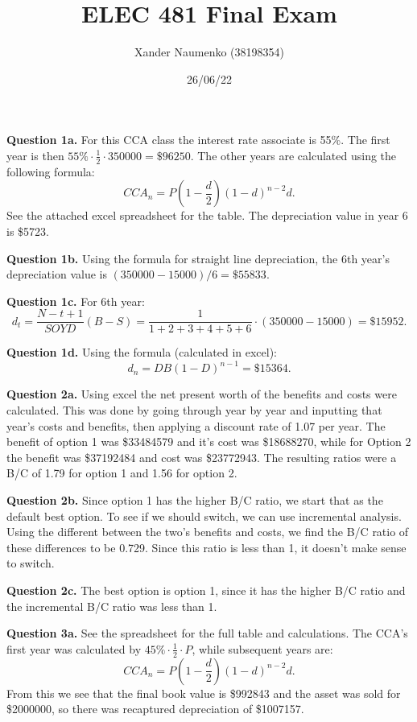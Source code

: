 \documentclass[letterpaper, reqno,11pt]{article}
\begin{document}
\title{ELEC 481 Final Exam}
\date{26/06/22}
\author{Xander Naumenko (38198354)}
\maketitle

{\noindent\bf Question 1a.} For this CCA class the interest rate associate is 55\%. The first year is then $55\%\cdot \frac{1}{2}\cdot 350000=\$96250$. The other years are calculated using the following formula: 
\[
CCA_n=P (1-\frac{d}{2})(1-d)^{n-2}d
.\]
See the attached excel spreadsheet for the table. The depreciation value in year 6 is \$5723. 

{\noindent\bf Question 1b.} Using the formula for straight line depreciation, the 6th year's depreciation value is $(350000-15000) /6=\$55833$. 

{\noindent\bf Question 1c.} For 6th year: 
\[
d_t=\frac{N-t+1}{SOYD}(B-S)=\frac{1}{1+2+3+4+5+6}\cdot (350000-15000)=\$15952
.\]

{\noindent\bf Question 1d.} Using the formula (calculated in excel): 
\[
d_n=DB(1-D)^{n-1}=\$15364
.\]

{\noindent\bf Question 2a.} Using excel the net present worth of the benefits and costs were calculated. This was done by going through year by year and inputting that year's costs and benefits, then applying a discount rate of 1.07 per year. The benefit of option 1 was \$33484579 and it's cost was \$18688270, while for Option 2 the benefit was \$37192484 and cost was \$23772943. The resulting ratios were a B/C of 1.79 for option 1 and 1.56 for option 2. 

\medskip

{\noindent\bf Question 2b.} Since option 1 has the higher B/C ratio, we start that as the default best option. To see if we should switch, we can use incremental analysis. Using the different between the two's benefits and costs, we find the B/C ratio of these differences to be 0.729. Since this ratio is less than 1, it doesn't make sense to switch. 

\medskip

{\noindent\bf Question 2c.} The best option is option 1, since it has the higher B/C ratio and the incremental B/C ratio was less than 1. 

\medskip

{\noindent\bf Question 3a.} See the spreadsheet for the full table and calculations. The CCA's first year was calculated by $45\%\cdot \frac{1}{2}\cdot P$, while subsequent years are: 
\[
CCA_n=P (1-\frac{d}{2})(1-d)^{n-2}d
.\]
From this we see that the final book value is \$992843 and the asset was sold for \$2000000, so there was recaptured depreciation of \$1007157. 
\end{document}
